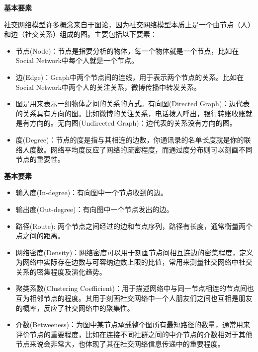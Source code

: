 \begin{frame}
	\textbf{基本要素}
	
	社交网络模型许多概念来自于图论，因为社交网络模型本质上是一个由节点（人）和边（社交关系）组成的图。主要包括以下要素：
	\begin{itemize}
		\item 节点(Node)：节点是指要分析的物体，每一个物体就是一个节点，比如在Social Network中每个人就是一个节点。
		\item 边(Edge)：Graph中两个节点间的连线，用于表示两个节点的关系。比如在Social Network中两个人的关注关系，微博传播中转发关系。
		\item 图是用来表示一组物体之间的关系的方式。有向图(Directed Graph)：边代表的关系具有方向的图。比如微博的关注关系，电话拨入呼出，银行转账收账就是有方向的。无向图(Undirected Graph)：边代表的关系没有方向的图。
		\item 度(Degree)：节点的度是指与其相连的边数，你通讯录的名单长度就是你的联络人度数。网络平均度反应了网络的疏密程度，而通过度分布则可以刻画不同节点的重要性。
	\end{itemize}

\end{frame}

\begin{frame}
	\textbf{基本要素}
	
	\begin{itemize}
		\item 输入度(In-degree)：有向图中一个节点收到的边。
		\item 输出度(Out-degree)：有向图中一个节点发出的边。
		\item 路径(Route): 两个节点之间经过的边和节点序列，路径有长度，通常衡量两个点之间的距离。
		\item 网络密度(Density)：网络密度可以用于刻画节点间相互连边的密集程度，定义为网络中实际存在边数与可容纳边数上限的比值，常用来测量社交网络中社交关系的密集程度及演化趋势。
		\item 聚类系数(Clustering Coefficient)：用于描述网络中与同一节点相连的节点间也互为相邻节点的程度。其用于刻画社交网络中一个人朋友们之间也互相是朋友的概率，反应了社交网络中的聚集性。
		\item 介数(Betweeness)：为图中某节点承载整个图所有最短路径的数量，通常用来评价节点的重要程度，比如在连接不同社群之间的中介节点的介数相对于其他节点来说会非常大，也体现了其在社交网络信息传递中的重要程度。
	\end{itemize}

\end{frame}

